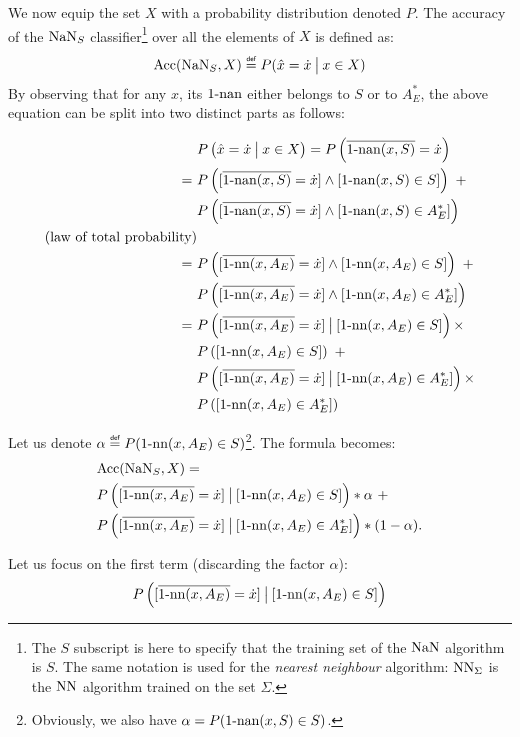 We now equip the set $X$ with a probability distribution denoted $P$.  The
accuracy of the $\NaN_S$ classifier\footnote{The $S$ subscript is here to
  specify that the training set of the $\NaN$ algorithm is $S$. The same
  notation is used for the \textit{nearest neighbour} algorithm: $\NN_\Sigma$ is the
  $\NN$ algorithm trained on the set $\Sigma$.} over all the elements of $X$ is
  defined as: $$\acc(\NaN_S, X)\eqdef P(\hat{x}=\dot{x} \given[\big] x \in X)$$ By
  observing that for any $x$, its $\nan$ either belongs to $S$ or to $A_E^*$,
  the above equation can be split into two distinct parts as follows:

  \begin{align*}
  &P\left(\hat{x}=\dot{x} \given[\big] x \in X\right) = P\left(\albl{\nan(x,
  S)} = \dot{x}\right)\\
=~&P\left([\albl{\nan(x, S)} = \dot{x} ]\wedge [\nan(x, S) \in S
] \right)~ + \\
&P\left([\albl{\nan(x, S)} = \dot{x}] \wedge [\nan(x, S) \in A_E^*]\right)\\ \mbox{(law of total probability)}\\
=~&P\left([\albl{\nn(x, A_E)} = \dot{x}] \wedge [\nn(x, A_E) \in S ]\right)~ + \\
  &P\left([\albl{\nn(x, A_E)} = \dot{x}] \wedge [\nn(x, A_E) \in A_E^*]\right)
\\
=~&P\left([\albl{\nn(x, A_E)} = \dot{x}] \given[\big] [\nn(x, A_E) \in S
]\right) \times \\ &P\left([\nn(x, A_E) \in S]\right) ~+ \\
&P\left([\albl{\nn(x, A_E)} = \dot{x}] \given[\big] [\nn(x, A_E) \in
A_E^*]\right) \times \\ &P\left([ \nn(x, A_E) \in A_E^*]\right)
\end{align*}

Let us denote  $\alpha \eqdef P(\nn(x, A_E) \in S)$\footnote{Obviously, we
also have $\alpha = P(\nan(x, S) \in S)$.}.
The formula becomes:
\begin{align*}
  &\acc(\NaN_S, X) = \\&P\left([\albl{\nn(x, A_E)} = \dot{x}] \given[\big] [\nn(x, A_E)
\in S] \right) * \alpha ~+ \\
&P\left([\albl{\nn(x, A_E)} = \dot{x}] \given[\big] [\nn(x, A_E) \in
A_E^*]\right) * (1 -
\alpha).
\end{align*}

Let us focus on the first term  (discarding the factor $\alpha$):
$$P\left([\albl{\nn(x, A_E)} = \dot{x}] \given[\big] [\nn(x, A_E) \in S] \right)$$

